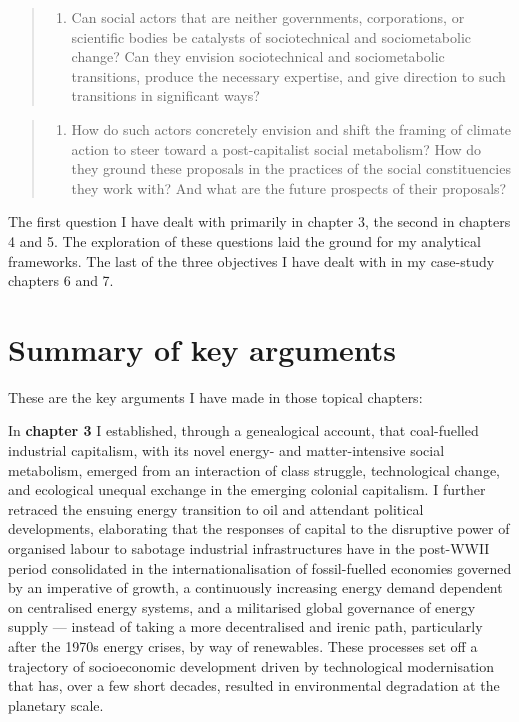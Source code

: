 \documentclass[a4paper, nobind]{templates/ociamthesis}
\providecommand{\tightlist}{%
  \setlength{\itemsep}{0pt}\setlength{\parskip}{0pt}}
\begin{document}
\begin{quote}
\begin{enumerate}
\def\labelenumi{\arabic{enumi}.}
\setcounter{enumi}{1}
\tightlist
\item
  Can social actors that are neither governments, corporations, or scientific bodies be catalysts of sociotechnical and sociometabolic change? Can they envision sociotechnical and sociometabolic transitions, produce the necessary expertise, and give direction to such transitions in significant ways?
\end{enumerate}
\end{quote}

\begin{quote}
\begin{enumerate}
\def\labelenumi{\arabic{enumi}.}
\setcounter{enumi}{2}
\tightlist
\item
  How do such actors concretely envision and shift the framing of climate action to steer toward a post-capitalist social metabolism? How do they ground these proposals in the practices of the social constituencies they work with? And what are the future prospects of their proposals?
\end{enumerate}
\end{quote}

The first question I have dealt with primarily in chapter 3, the second in chapters 4 and 5. The exploration of these questions laid the ground for my analytical frameworks. The last of the three objectives I have dealt with in my case-study chapters 6 and 7.

\hypertarget{summary-of-key-arguments}{%
\section{Summary of key arguments}\label{summary-of-key-arguments}}

These are the key arguments I have made in those topical chapters:

In \textbf{chapter 3} I established, through a genealogical account, that coal-fuelled industrial capitalism, with its novel energy- and matter-intensive social metabolism, emerged from an interaction of class struggle, technological change, and ecological unequal exchange in the emerging colonial capitalism. I further retraced the ensuing energy transition to oil and attendant political developments, elaborating that the responses of capital to the disruptive power of organised labour to sabotage industrial infrastructures have in the post-WWII period consolidated in the internationalisation of fossil-fuelled economies governed by an imperative of growth, a continuously increasing energy demand dependent on centralised energy systems, and a militarised global governance of energy supply --- instead of taking a more decentralised and irenic path, particularly after the 1970s energy crises, by way of renewables. These processes set off a trajectory of socioeconomic development driven by technological modernisation that has, over a few short decades, resulted in environmental degradation at the planetary scale.
\end{document}
